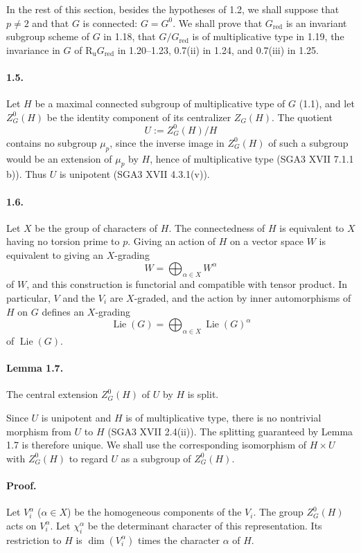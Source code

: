 \documentclass[11pt]{article}
\newcommand{\Lie}{\operatorname{Lie}}
\newcommand{\Ru}{\operatorname{R_u}}
\newcommand{\red}{\mathrm{red}}
\theoremstyle{plain}
\theoremstyle{definition}
\begin{document}
In the rest of this section, besides the hypotheses of 1.2, we shall suppose that $p\ne2$ and that $G$ is connected: $G=G^0$. We shall prove that $G_{\red}$ is an invariant subgroup scheme of $G$ in 1.18, that $G/G_{\red}$ is of multiplicative type in 1.19, the invariance in $G$ of $\Ru G_{\red}$ in 1.20--1.23, 0.7(ii) in 1.24, and 0.7(iii) in 1.25.

\paragraph{1.5.} Let $H$ be a maximal connected subgroup of multiplicative type of $G$ (1.1), and let $Z^0_G(H)$ be the identity component of its centralizer $Z_G(H)$. The quotient
\[
   U:=Z^0_G(H)/H
\]
contains no subgroup $\mu_p$, since the inverse image in $Z^0_G(H)$ of such a subgroup would be an extension of $\mu_p$ by $H$, hence of multiplicative type (SGA3 XVII 7.1.1 b)). Thus $U$ is unipotent (SGA3 XVII 4.3.1(v)).

\paragraph{1.6.} Let $X$ be the group of characters of $H$. The connectedness of $H$ is equivalent to $X$ having no torsion prime to $p$. Giving an action of $H$ on a vector space $W$ is equivalent to giving an $X$-grading
\[
   W=\bigoplus_{\alpha\in X} W^\alpha
\]
of $W$, and this construction is functorial and compatible with tensor product. In particular, $V$ and the $V_i$ are $X$-graded, and the action by inner automorphisms of $H$ on $G$ defines an $X$-grading
\[
   \Lie(G)=\bigoplus_{\alpha\in X}\Lie(G)^\alpha
\]
of $\Lie(G)$.

\paragraph{Lemma 1.7.} The central extension $Z^0_G(H)$ of $U$ by $H$ is split.

Since $U$ is unipotent and $H$ is of multiplicative type, there is no nontrivial morphism from $U$ to $H$ (SGA3 XVII 2.4(ii)). The splitting guaranteed by Lemma 1.7 is therefore unique. We shall use the corresponding isomorphism of $H\times U$ with $Z^0_G(H)$ to regard $U$ as a subgroup of $Z^0_G(H)$.

\paragraph{Proof.} Let $V^\alpha_i$ ($\alpha\in X$) be the homogeneous components of the $V_i$. The group $Z^0_G(H)$ acts on $V^\alpha_i$. Let $\chi^\alpha_i$ be the determinant character of this representation. Its restriction to $H$ is $\dim(V^\alpha_i)$ times the character $\alpha$ of $H$.
\end{document}
